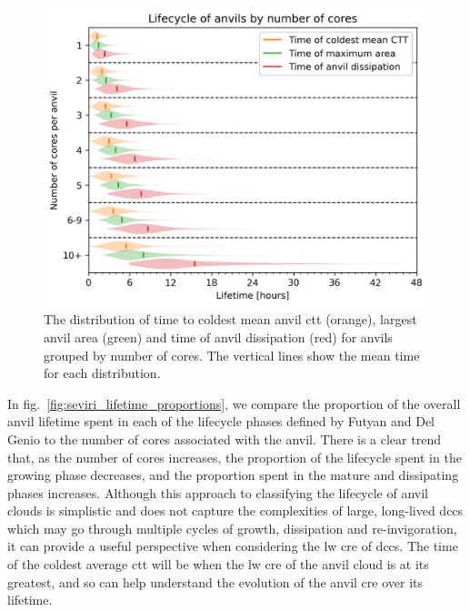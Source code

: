 \begin{figure}[tp]
    \includegraphics[width=\textwidth]{figures/ch3_08.png}
    \caption[
    The distribution of time to coldest mean anvil \acrshort{ctt}, largest anvil area and time of anvil dissipation
    ]{
    The distribution of time to coldest mean anvil \acrshort{ctt} (orange), largest anvil area (green) and time of anvil dissipation (red) for anvils grouped by number of cores. The vertical lines show the mean time for each distribution.
    }
    \label{fig:seviri_lifetime_dists}
\end{figure}


In fig.~\ref{fig:seviri_lifetime_proportions}, we compare the proportion of the overall anvil lifetime spent
in each of the lifecycle phases defined by Futyan and Del Genio to the
number of cores associated with the anvil. There is a clear trend that,
as the number of cores increases, the proportion of the lifecycle spent
in the growing phase decreases, and the proportion spent in the mature
and dissipating phases increases. Although this approach to classifying
the lifecycle of anvil clouds is simplistic and does not capture the
complexities of large, long-lived \acrshort{dcc}s which may go through multiple
cycles of growth, dissipation and re-invigoration, it can provide a
useful perspective when considering the \acrshort{lw} \acrshort{cre} of \acrshort{dcc}s. The time of the
coldest average \acrshort{ctt} will be when the \acrshort{lw} \acrshort{cre} of the anvil cloud is at its
greatest, and so can help understand the evolution of the anvil \acrshort{cre} over
its lifetime.


